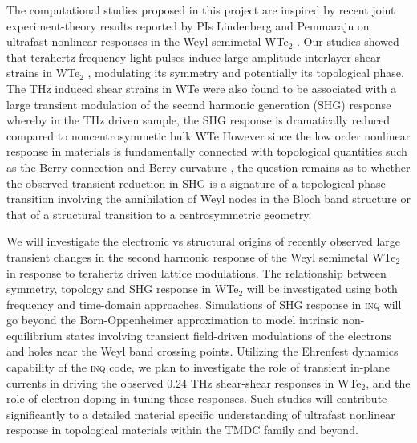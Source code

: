 The computational studies proposed in this project are inspired by recent joint experiment-theory results reported by PIs Lindenberg and Pemmaraju on ultrafast nonlinear responses in the Weyl semimetal WTe$_2$ . Our studies showed that terahertz frequency light pulses induce large amplitude interlayer shear strains in WTe$_2$ , modulating its symmetry and potentially its topological phase. The THz induced shear strains in WTe were also found to be associated with a large transient modulation of the second harmonic generation (SHG) response whereby in the THz driven sample, the SHG response is dramatically reduced compared to noncentrosymmetic bulk WTe However since the low order nonlinear response in materials is fundamentally connected with topological quantities such as the Berry connection and Berry curvature , the question remains as to whether the observed transient reduction in SHG is a signature of a topological phase transition involving the annihilation of Weyl nodes in the Bloch band structure or that of a structural transition to a centrosymmetric geometry.

We will investigate the electronic vs structural origins of recently observed large transient changes in the second harmonic response of the Weyl semimetal WTe$_2$ in response to terahertz driven lattice modulations. The relationship between symmetry, topology and SHG response in WTe$_2$ will be investigated using both frequency and time-domain approaches. Simulations of SHG response in \textsc{inq} will go beyond the Born-Oppenheimer approximation to model intrinsic non-equilibrium states involving transient field-driven modulations of the electrons and holes near the Weyl band crossing points. Utilizing the Ehrenfest dynamics capability of the \textsc{inq} code, we plan to investigate the role of transient in-plane currents in driving the observed 0.24 THz shear-shear responses in WTe$_2$, and the role of electron doping in tuning these responses. Such studies will contribute significantly to a detailed material specific understanding of ultrafast nonlinear response in topological materials within the TMDC family and beyond.

\clearpage

